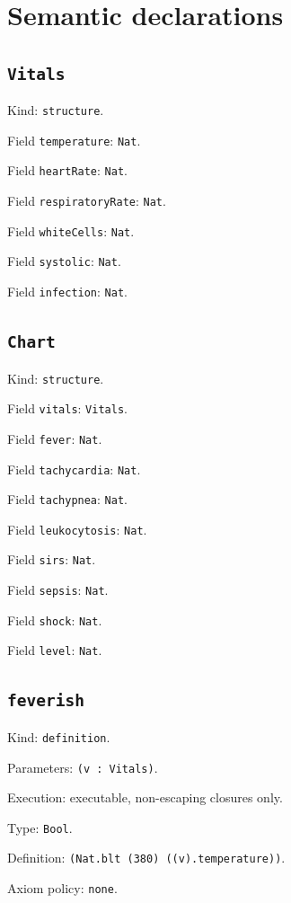 \documentclass[11pt]{article}
\begin{document}
\section*{Semantic declarations}
\subsection*{\texttt{Vitals}}
\noindent Kind: \texttt{structure}.\par
\noindent Field \texttt{temperature}: \texttt{Nat}.\par
\noindent Field \texttt{heartRate}: \texttt{Nat}.\par
\noindent Field \texttt{respiratoryRate}: \texttt{Nat}.\par
\noindent Field \texttt{whiteCells}: \texttt{Nat}.\par
\noindent Field \texttt{systolic}: \texttt{Nat}.\par
\noindent Field \texttt{infection}: \texttt{Nat}.\par
\subsection*{\texttt{Chart}}
\noindent Kind: \texttt{structure}.\par
\noindent Field \texttt{vitals}: \texttt{Vitals}.\par
\noindent Field \texttt{fever}: \texttt{Nat}.\par
\noindent Field \texttt{tachycardia}: \texttt{Nat}.\par
\noindent Field \texttt{tachypnea}: \texttt{Nat}.\par
\noindent Field \texttt{leukocytosis}: \texttt{Nat}.\par
\noindent Field \texttt{sirs}: \texttt{Nat}.\par
\noindent Field \texttt{sepsis}: \texttt{Nat}.\par
\noindent Field \texttt{shock}: \texttt{Nat}.\par
\noindent Field \texttt{level}: \texttt{Nat}.\par
\subsection*{\texttt{feverish}}
\noindent Kind: \texttt{definition}.\par
\noindent Parameters: \texttt{(v : Vitals)}.\par
\noindent Execution: executable, non-escaping closures only.\par
\noindent Type: \texttt{Bool}.\par
\noindent Definition: \texttt{(Nat.blt (380) ((v).temperature))}.\par
\noindent Axiom policy: \texttt{none}.\par
\end{document}
